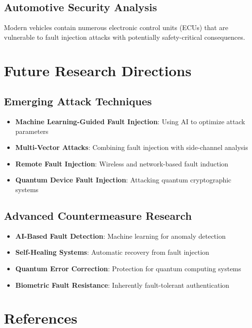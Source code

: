 \documentclass[12pt,a4paper]{article}
\begin{document}
\subsection{Automotive Security Analysis}

Modern vehicles contain numerous electronic control units (ECUs) that are vulnerable to fault injection attacks with potentially safety-critical consequences.

\section{Future Research Directions}

\subsection{Emerging Attack Techniques}

\begin{itemize}
    \item \textbf{Machine Learning-Guided Fault Injection}: Using AI to optimize attack parameters
    \item \textbf{Multi-Vector Attacks}: Combining fault injection with side-channel analysis
    \item \textbf{Remote Fault Injection}: Wireless and network-based fault induction
    \item \textbf{Quantum Device Fault Injection}: Attacking quantum cryptographic systems
\end{itemize}

\subsection{Advanced Countermeasure Research}

\begin{itemize}
    \item \textbf{AI-Based Fault Detection}: Machine learning for anomaly detection
    \item \textbf{Self-Healing Systems}: Automatic recovery from fault injection
    \item \textbf{Quantum Error Correction}: Protection for quantum computing systems
    \item \textbf{Biometric Fault Resistance}: Inherently fault-tolerant authentication
\end{itemize}

\section{References}
\end{document}
